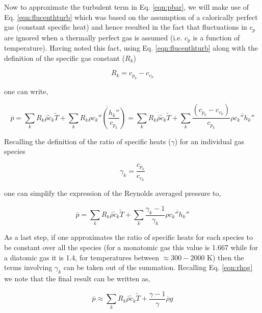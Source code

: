 	Now to approximate the turbulent term in Eq. \ref{eqn:pbar}, we will make use of Eq. \ref{eqn:flucenthturb} which
was based on the assumption of a calorically perfect gas (constant specific heat) and hence resulted in the fact that
fluctuations in $c_p$ are ignored when a thermally perfect gas is assumed (i.e. $c_p$ is a function of temperature).  
Having noted this fact, using Eq. \ref{eqn:flucenthturb} along with the definition of the specific gas constant ($R_k$) 

\begin{equation}
	R_k = c_{p_k} - c_{v_k}
\label{eqn:spgasconst}
\end{equation}
	
	one can write,

\begin{displaymath}
	\overline{p} = \sum_{k} R_k \overline{\rho}\tilde c_k \tilde T + \sum_{k}R_k\overline{\rho c_k'' (\frac{h_k''}{c_{p_k}})}
	= \sum_{k} R_k \overline{\rho}\tilde c_k \tilde T + \sum_{k}\frac{(c_{p_k} - c_{v_k})}{c_{p_k}}
	\overline{\rho c_k'' h_k''}
\end{displaymath}

	Recalling the definition of the ratio of specific heats ($\gamma$) for an individual gas species

\begin{equation}
	\gamma_k = \frac{c_{p_k}}{c_{v_k}}
\label{eqn:gamma}
\end{equation}

	one can simplify the expression of the Reynolds averaged pressure to,

\begin{displaymath}
	\overline{p} = \sum_{k} R_k \overline{\rho}\tilde c_k \tilde T + \sum_{k}\frac{\gamma_k -1}{\gamma_k}
	\overline{\rho c_k'' h_k''}
\end{displaymath}

	As a last step, if one approximates the ratio of specific heats for each species to be constant over all the 
species (for a monatomic gas this value is 1.667 while for a diatomic gas it is 1.4, for temperatures between $\approx
300 - 2000$ K) then the terms involving $\gamma_k$ can be taken out of the summation.  Recalling Eq. \ref{eqn:rhog}
we note that the final result can be written as,

\begin{equation}
	\overline{p} \approx \sum_{k} R_k \overline{\rho}\tilde c_k \tilde T + \frac{\gamma -1}{\gamma}\overline{\rho}g
\label{eqn:pbarturb}	
\end{equation}

